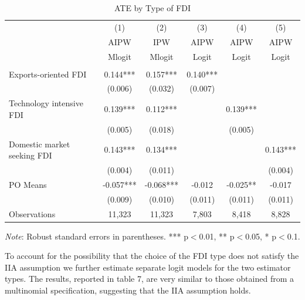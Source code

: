 \documentclass[a4paper,11pt]{scrartcl}
\begin{document}
\begin{table}[htbp]
	\centering
	\caption{ATE by Type of FDI}
	\label{tab:bytype}
\begin{threeparttable}

\begin{tabular}{lccccc} 
		\hline
		\hline
 	& (1) & (2) & (3) & (4) & (5) \\
	& AIPW & IPW  & AIPW  & AIPW & AIPW \\ 
	& Mlogit & Mlogit &Logit &Logit &Logit\\
		\hline
 			&  &  &  &  &   \\
Exports-oriented FDI 	& 0.144*** &   0.157*** & 0.140*** &  &  \\
 						& (0.006) &   (0.032) & (0.007) &  &\\
Technology intensive FDI & 0.139***   & 0.112*** &  & 0.139*** &   \\
 						 & (0.005)  & (0.018) &  &  (0.005)&  \\
Domestic market seeking FDI & 0.143*** &   0.134*** &  &  &0.143*** \\
 							& (0.004)   & (0.011) &  &  & (0.004)  \\
PO Means 		&   -0.057*** &   -0.068*** &-0.012  &-0.025**  & -0.017    \\
 				&   (0.009) &   (0.010) &  (0.011)&(0.011)  & (0.011) \\
Observations 	& 11,323  & 11,323 &  7,803  & 8,418 & 8,828  \\ 
		\hline
		\hline
\end{tabular}

\begin{tablenotes}[flushleft]
	\footnotesize
\item \textit{Note}: Robust standard errors in parentheses. *** p$<$0.01, ** p$<$0.05, * p$<$0.1.
\end{tablenotes}

\end{threeparttable}
\end{table}

To account for the possibility that the choice of the FDI type does not satisfy the IIA assumption we further estimate separate logit models for the two estimator types. The results, reported in table 7, are very similar to those obtained from a multinomial specification, suggesting that the IIA assumption holds.  
\end{document}
